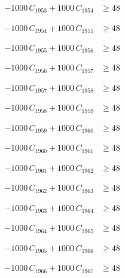 \documentclass[a4paper,11pt]{article}
\begin{document}
\begin{align}
-1000\,C_{1953} + 1000\,C_{1954} &\geq 48 \nonumber
\end{align}

\begin{align}
-1000\,C_{1954} + 1000\,C_{1955} &\geq 48 \nonumber
\end{align}

\begin{align}
-1000\,C_{1955} + 1000\,C_{1956} &\geq 48 \nonumber
\end{align}

\begin{align}
-1000\,C_{1956} + 1000\,C_{1957} &\geq 48 \nonumber
\end{align}

\begin{align}
-1000\,C_{1957} + 1000\,C_{1958} &\geq 48 \nonumber
\end{align}

\begin{align}
-1000\,C_{1958} + 1000\,C_{1959} &\geq 48 \nonumber
\end{align}

\begin{align}
-1000\,C_{1959} + 1000\,C_{1960} &\geq 48 \nonumber
\end{align}

\begin{align}
-1000\,C_{1960} + 1000\,C_{1961} &\geq 48 \nonumber
\end{align}

\begin{align}
-1000\,C_{1961} + 1000\,C_{1962} &\geq 48 \nonumber
\end{align}

\begin{align}
-1000\,C_{1962} + 1000\,C_{1963} &\geq 48 \nonumber
\end{align}

\begin{align}
-1000\,C_{1963} + 1000\,C_{1964} &\geq 48 \nonumber
\end{align}

\begin{align}
-1000\,C_{1964} + 1000\,C_{1965} &\geq 48 \nonumber
\end{align}

\begin{align}
-1000\,C_{1965} + 1000\,C_{1966} &\geq 48 \nonumber
\end{align}

\begin{align}
-1000\,C_{1966} + 1000\,C_{1967} &\geq 48 \nonumber
\end{align}
\end{document}
